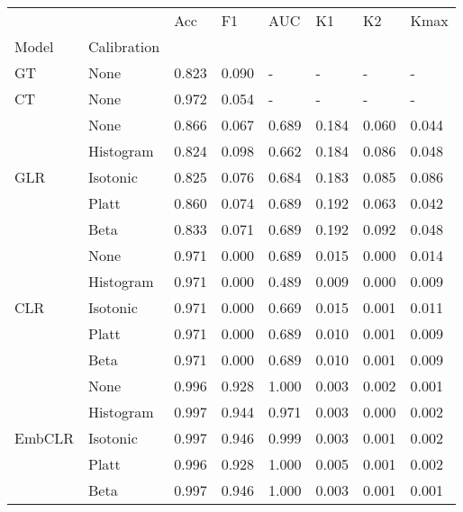 \begin{tabular}{llllllll}
\toprule
 &  & Acc & F1 & AUC & K1 & K2 & Kmax \\
Model & Calibration &  &  &  &  &  &  \\
\midrule
GT & None & 0.823 & 0.090 & - & - & - & - \\
\cline{1-8}
CT & None & 0.972 & 0.054 & - & - & - & - \\
\cline{1-8}
\multirow[t]{5}{*}{GLR} & None & 0.866 & 0.067 & 0.689 & 0.184 & 0.060 & 0.044 \\
 & Histogram & 0.824 & 0.098 & 0.662 & 0.184 & 0.086 & 0.048 \\
 & Isotonic & 0.825 & 0.076 & 0.684 & 0.183 & 0.085 & 0.086 \\
 & Platt & 0.860 & 0.074 & 0.689 & 0.192 & 0.063 & 0.042 \\
 & Beta & 0.833 & 0.071 & 0.689 & 0.192 & 0.092 & 0.048 \\
\cline{1-8}
\multirow[t]{5}{*}{CLR} & None & 0.971 & 0.000 & 0.689 & 0.015 & 0.000 & 0.014 \\
 & Histogram & 0.971 & 0.000 & 0.489 & 0.009 & 0.000 & 0.009 \\
 & Isotonic & 0.971 & 0.000 & 0.669 & 0.015 & 0.001 & 0.011 \\
 & Platt & 0.971 & 0.000 & 0.689 & 0.010 & 0.001 & 0.009 \\
 & Beta & 0.971 & 0.000 & 0.689 & 0.010 & 0.001 & 0.009 \\
\cline{1-8}
\multirow[t]{5}{*}{EmbCLR} & None & 0.996 & 0.928 & 1.000 & 0.003 & 0.002 & 0.001 \\
 & Histogram & 0.997 & 0.944 & 0.971 & 0.003 & 0.000 & 0.002 \\
 & Isotonic & 0.997 & 0.946 & 0.999 & 0.003 & 0.001 & 0.002 \\
 & Platt & 0.996 & 0.928 & 1.000 & 0.005 & 0.001 & 0.002 \\
 & Beta & 0.997 & 0.946 & 1.000 & 0.003 & 0.001 & 0.001 \\
\cline{1-8}
\bottomrule
\end{tabular}
